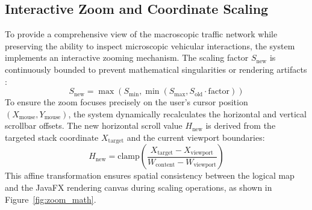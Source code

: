 \documentclass[../report_main.tex]{subfiles}
\begin{document}
\subsection{Interactive Zoom and Coordinate Scaling}
To provide a comprehensive view of the macroscopic traffic network while preserving the ability to inspect microscopic vehicular interactions, the system implements an interactive zooming mechanism. The scaling factor $S_{\text{new}}$ is continuously bounded to prevent mathematical singularities or rendering artifacts \cite{giaitichToan}:
\begin{equation}
    S_{\text{new}} = \max\left(S_{\text{min}}, \min\left(S_{\text{max}}, S_{\text{old}} \cdot \text{factor}\right)\right)
\end{equation}
To ensure the zoom focuses precisely on the user's cursor position $(X_{\text{mouse}}, Y_{\text{mouse}})$, the system dynamically recalculates the horizontal and vertical scrollbar offsets. The new horizontal scroll value $H_{\text{new}}$ is derived from the targeted stack coordinate $X_{\text{target}}$ and the current viewport boundaries:
\begin{equation}
    H_{\text{new}} = \text{clamp} \left( \frac{X_{\text{target}} - X_{\text{viewport}}}{W_{\text{content}} - W_{\text{viewport}}} \right)
\end{equation}
This affine transformation ensures spatial consistency between the logical map and the JavaFX rendering canvas during scaling operations, as shown in Figure~\ref{fig:zoom_math}.
\end{document}

